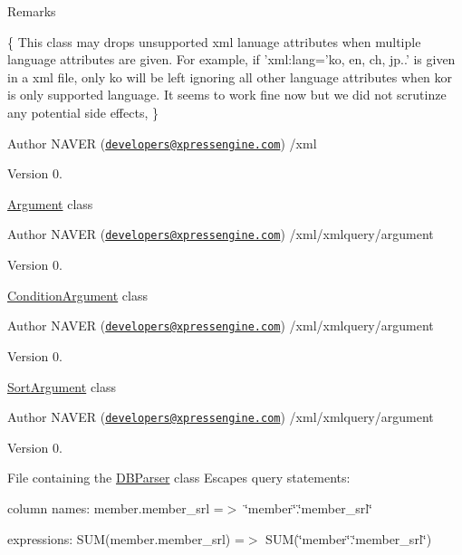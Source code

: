 \begin{DoxyItemize}
\begin{DoxyRemark}{Remarks}
\begin{DoxyPre}\{ 
This class may drops unsupported xml lanuage attributes when multiple language attributes are given.
For example, if 'xml:lang='ko, en, ch, jp..' is given in a xml file, only ko will be left ignoring all other language
attributes when kor is only supported language. It seems to work fine now but we did not scrutinze any potential side effects,
\}\end{DoxyPre}

\end{DoxyRemark}
\begin{DoxyAuthor}{Author}
N\-A\-V\-E\-R (\href{mailto:developers@xpressengine.com}{\tt developers@xpressengine.\-com}) /xml 
\end{DoxyAuthor}
\begin{DoxyVersion}{Version}
0.
\end{DoxyVersion}
\hyperlink{classArgument}{Argument} class \begin{DoxyAuthor}{Author}
N\-A\-V\-E\-R (\href{mailto:developers@xpressengine.com}{\tt developers@xpressengine.\-com}) /xml/xmlquery/argument 
\end{DoxyAuthor}
\begin{DoxyVersion}{Version}
0.
\end{DoxyVersion}
\hyperlink{classConditionArgument}{Condition\-Argument} class \begin{DoxyAuthor}{Author}
N\-A\-V\-E\-R (\href{mailto:developers@xpressengine.com}{\tt developers@xpressengine.\-com}) /xml/xmlquery/argument 
\end{DoxyAuthor}
\begin{DoxyVersion}{Version}
0.
\end{DoxyVersion}
\hyperlink{classSortArgument}{Sort\-Argument} class \begin{DoxyAuthor}{Author}
N\-A\-V\-E\-R (\href{mailto:developers@xpressengine.com}{\tt developers@xpressengine.\-com}) /xml/xmlquery/argument 
\end{DoxyAuthor}
\begin{DoxyVersion}{Version}
0.
\end{DoxyVersion}
File containing the \hyperlink{classDBParser}{D\-B\-Parser} class Escapes query statements\-: \par

\begin{DoxyItemize}
\item column names\-: member.\-member\-\_\-srl =$>$ \char`\"{}member\char`\"{}.\char`\"{}member\-\_\-srl\char`\"{} \par

\item expressions\-: S\-U\-M(member.\-member\-\_\-srl) =$>$ S\-U\-M(\char`\"{}member\char`\"{}.\char`\"{}member\-\_\-srl\char`\"{}) \par

\end{DoxyItemize}
\end{DoxyItemize}

